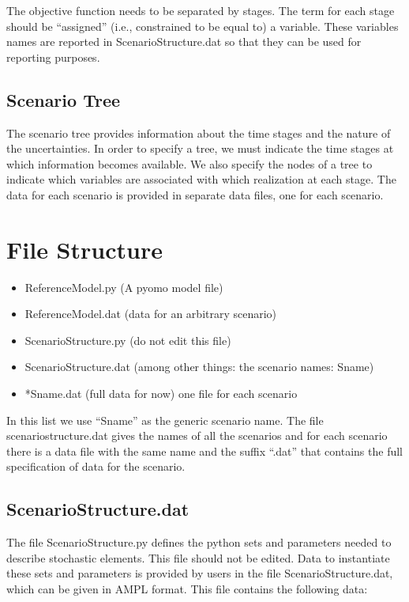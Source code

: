 The objective function needs to be separated by stages. The term for each stage should be ``assigned'' (i.e., constrained to be equal to)
a variable. These variables names are reported in ScenarioStructure.dat so that they can be used for reporting purposes.

\subsection{Scenario Tree}

The scenario tree provides information about the time stages and the nature of the uncertainties. In order to specify a tree, we must
indicate the time stages at which information becomes available. We also specify the nodes of a tree to indicate which variables
are associated with which realization at each stage. The data for each scenario is provided in separate data files, one for each scenario.

\section{File Structure}

\begin{itemize}
\item ReferenceModel.py  (A pyomo model file)
\item ReferenceModel.dat (data for an arbitrary scenario)
\item ScenarioStructure.py (do not edit this file)
\item ScenarioStructure.dat (among other things: the scenario names: Sname)
\item *Sname.dat   (full data for now) one file for each scenario
\end{itemize}

In this list we use ``Sname'' as the generic scenario name. The file scenariostructure.dat gives the names of all the scenarios and for each scenario there is a data file with the same name and the suffix ``.dat'' that contains the full specification of data for the scenario.

\subsection{ScenarioStructure.dat}

The file ScenarioStructure.py defines the python sets and parameters needed to describe stochastic elements. This file should not be edited. Data
to instantiate these sets and parameters is provided by users in the file ScenarioStructure.dat, which can be given in AMPL \cite{ampl} format. 
This file contains the following data:

